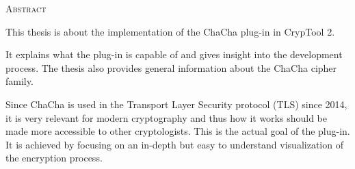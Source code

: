 
\begin{center}
  \textsc{Abstract}
\end{center}

\noindent
This thesis is about the implementation of the ChaCha plug-in in CrypTool 2.

\medskip
\noindent
It explains what the plug-in is capable of and gives insight into the development process. The thesis also provides general information about the ChaCha cipher family.

\medskip
\noindent
Since ChaCha is used in the Transport Layer Security protocol (TLS) since 2014, it is very relevant for modern cryptography and thus how it works should be made more accessible to other cryptologists. This is the actual goal of the plug-in. It is achieved by focusing on an in-depth but easy to understand visualization of the encryption process.

